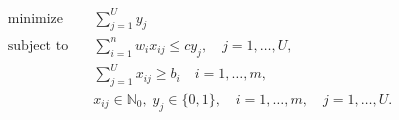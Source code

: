 \begin{align*}
\text{minimize} \quad & \sum_{j=1}^U y_j \\
\text{subject to} \quad & \sum_{i=1}^n w_i x_{ij} \leq c y_j, \quad j = 1, \ldots, U, \\
& \sum_{j=1}^U x_{ij} \geq b_i \quad i = 1, \ldots, m,\\
& x_{ij} \in \mathbb{N}_0, \; y_j \in \lbrace 0, 1 \rbrace, \quad i = 1, \ldots, m, \quad j = 1, \ldots, U.
\end{align*}


